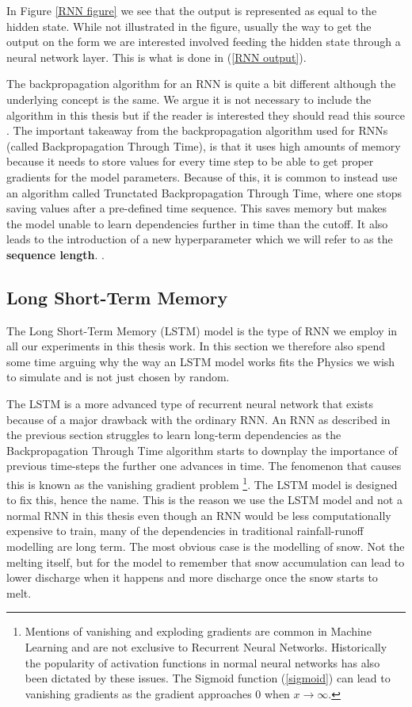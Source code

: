 In Figure \ref{RNN figure} we see that the output is represented as equal to the 
hidden state. While not illustrated in the figure, usually the way to get the output 
on the form we are interested involved feeding the hidden state through a neural 
network layer. This is what is done in (\ref{RNN output}).

The backpropagation algorithm for an RNN is quite a bit different although the 
underlying concept is the same. We argue it is not necessary to include the algorithm 
in this thesis but if the reader is interested they should read this source \citet{BPTT}.
The important takeaway from the backpropagation algorithm used for RNNs (called 
Backpropagation Through Time), is that it uses high amounts of memory because 
it needs to store values for every time step to be able to get proper gradients 
for the model parameters. Because of this, it is common to instead use an algorithm 
called Trunctated Backpropagation Through Time, where one stops saving values after 
a pre-defined time sequence. This saves memory but makes the model unable to learn 
dependencies further in time than the cutoff. It also leads to the introduction of 
a new hyperparameter which we will refer to as the \textbf{sequence length}. \citationneeded.

\subsection{Long Short-Term Memory}
\label{LSTM Theory}
The Long Short-Term Memory (LSTM) model is the type of RNN we employ in all our 
experiments in this thesis work. In this section we therefore also spend some 
time arguing why the way an LSTM model works fits the Physics we wish to simulate 
and is not just chosen by random. 

The LSTM is a more advanced type of recurrent neural network that exists because 
of a major drawback with the ordinary RNN. An RNN as described in the previous section 
struggles to learn long-term dependencies as the Backpropagation Through Time 
algorithm starts to downplay the importance of previous time-steps the further one 
advances in time. The fenomenon that causes this is known as the vanishing gradient 
problem \citep{bengio1994learning} \citep{graves2012long} \footnote{Mentions of 
vanishing and exploding gradients are common in Machine Learning and are not 
exclusive to Recurrent Neural Networks. Historically the popularity of activation 
functions in normal neural networks has also been dictated by these issues. The 
Sigmoid function (\ref{sigmoid}) can lead to vanishing gradients as the gradient 
approaches $0$ when $x\rightarrow \infty$.}.
The LSTM model is designed to fix this, 
hence the name. This is the reason we use the LSTM model and not a normal RNN in 
this thesis even though an RNN would be less computationally expensive to train, 
many of the dependencies in traditional rainfall-runoff modelling are long term. 
The most obvious case is the modelling of snow. Not the melting itself, but for 
the model to remember that snow accumulation can lead to lower discharge when it 
happens and more discharge once the snow starts to melt.

